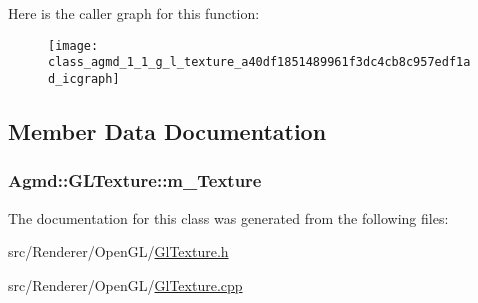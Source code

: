 Here is the caller graph for this function\+:\nopagebreak
\begin{figure}[H]
\begin{center}
\leavevmode
\texttt{[image: class\_agmd\_1\_1\_g\_l\_texture\_a40df1851489961f3dc4cb8c957edf1ad\_icgraph]}
\end{center}
\end{figure}




\subsection{Member Data Documentation}
\hypertarget{class_agmd_1_1_g_l_texture_af69c322f23124938ee25c929d0661f41}{
\subsubsection[{m\+\_\+\+Texture}]{ Agmd\+::\+G\+L\+Texture\+::m\+\_\+\+Texture\hspace{0.3cm}{\ttfamily [protected]}}}\label{class_agmd_1_1_g_l_texture_af69c322f23124938ee25c929d0661f41}


The documentation for this class was generated from the following files\+:\begin{DoxyCompactItemize}
\item 
src/\+Renderer/\+Open\+G\+L/\hyperlink{_gl_texture_8h}{Gl\+Texture.\+h}\item 
src/\+Renderer/\+Open\+G\+L/\hyperlink{_gl_texture_8cpp}{Gl\+Texture.\+cpp}\end{DoxyCompactItemize}
